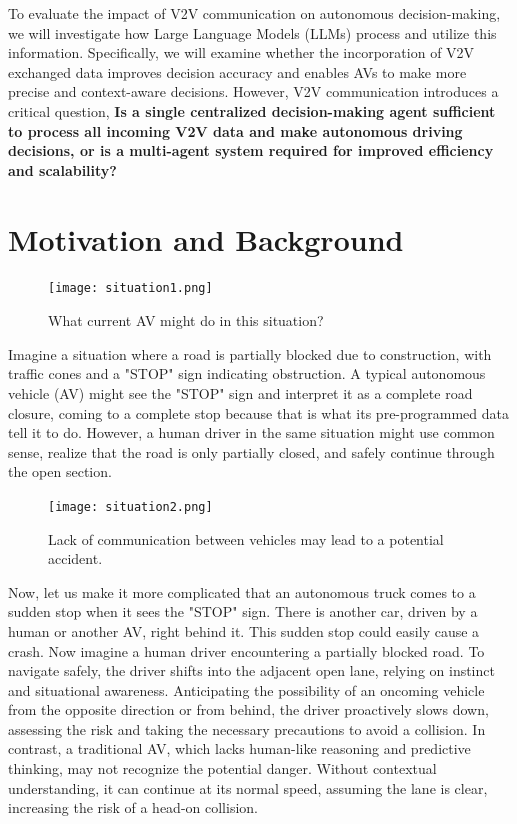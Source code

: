 \documentclass[conference]{IEEEtran}
\begin{document}
To evaluate the impact of V2V communication on autonomous decision-making, we will investigate how Large Language Models (LLMs) process and utilize this information. Specifically, we will examine whether the incorporation of V2V exchanged data improves decision accuracy and enables AVs to make more precise and context-aware decisions.
However, V2V communication introduces a critical question,\textbf{ Is a single centralized decision-making agent sufficient to process all incoming V2V data and make autonomous driving decisions, or is a multi-agent system required for improved efficiency and scalability?}



\section{Motivation and Background}
\begin{figure}[ht]
    \centering
    \texttt{[image: situation1.png]}
    \caption{What current AV might do in this situation?}
    \label{fig:enter-label-unique}
\end{figure}
Imagine a situation where a road is partially blocked due to construction, with traffic cones and a "STOP" sign indicating obstruction. A typical autonomous vehicle (AV) might see the "STOP" sign and interpret it as a complete road closure, coming to a complete stop because that is what its pre-programmed data tell it to do. However, a human driver in the same situation might use common sense, realize that the road is only partially closed, and safely continue through the open section.
\begin{figure}[ht]
    \centering
    \texttt{[image: situation2.png]}
    \caption{Lack of communication between vehicles may lead to a potential accident.}
    \label{fig:enter-label-unique-2}
\end{figure}

Now, let us make it more complicated that an autonomous truck comes to a sudden stop when it sees the "STOP" sign. There is another car, driven by a human or another AV, right behind it. This sudden stop could easily cause a crash. 
Now imagine a human driver encountering a partially blocked road. To navigate safely, the driver shifts into the adjacent open lane, relying on instinct and situational awareness. Anticipating the possibility of an oncoming vehicle from the opposite direction or from behind, the driver proactively slows down, assessing the risk and taking the necessary precautions to avoid a collision. In contrast, a traditional AV, which lacks human-like reasoning and predictive thinking, may not recognize the potential danger. Without contextual understanding, it can continue at its normal speed, assuming the lane is clear, increasing the risk of a head-on collision.
\end{document}
